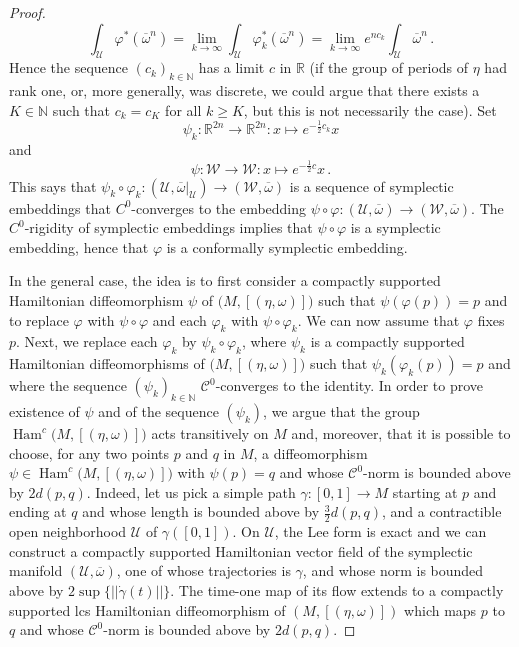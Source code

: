 \documentclass{amsart}
\newcommand{\N}{\mathbb{N}}
\newcommand{\R}{\mathbb{R}}
\DeclareMathOperator{\Ham}{Ham}
\theoremstyle{remark}
\begin{document}
\begin{proof}
$$
\int_{\mathcal{U}} \varphi^*(\overline{\omega}^n)
= \lim_{k\to \infty} \int_{\mathcal{U}} \varphi_k^*(\overline{\omega}^n)
= \lim_{k\to \infty}  e^{nc_k} \int_{\mathcal{U}} \overline{\omega}^n \,.
$$
Hence the sequence $(c_k)_{k \in \N}$ has a limit $c$ in $\R$
(if the group of periods of $\eta$ had rank one, or, more generally, was discrete,
we could argue that there exists a $K \in \N$ such that $c_k = c_K$ for all $k \geq K$,
but this is not necessarily the case).
Set 
$$
\psi_k : \R^{2n} \to \R^{2n} : x \mapsto e^{-\frac12 c_k} x
$$
and 
$$
\psi : \mathcal{W} \to \mathcal{W} : x \mapsto e^{-\frac12 c} x \,.
$$ 
This says that
$\psi_k \circ \varphi_k : (\mathcal{U}, \overline{\omega}|_{\mathcal{U}})
\to (\mathcal{W}, \overline{\omega})$
is a sequence of symplectic embeddings
that $C^0$-converges to the embedding
$\psi \circ \varphi : (\mathcal{U}, \overline{\omega})
\to (\mathcal{W}, \overline{\omega})$.
The $C^0$-rigidity of symplectic embeddings implies that
$\psi \circ \varphi$ is a symplectic embedding,
hence that $\varphi$ is a conformally symplectic embedding.

In the general case,
the idea is to first consider a compactly supported Hamiltonian diffeomorphism
$\psi$ of $\big(M, [(\eta, \omega)]\big)$
such that $\psi(\varphi(p)) = p$
and to replace $\varphi$ with $\psi \circ \varphi$
and each $\varphi_k$ with $\psi \circ \varphi_k$.
We can now assume that $\varphi$ fixes $p$.
Next, we replace each $\varphi_k$ by $\psi_k \circ \varphi_k$,
where $\psi_k$ is a compactly supported Hamiltonian diffeomorphisms
of $\big(M, [(\eta, \omega)]\big)$
such that $\psi_k (\varphi_k(p)) = p$
and where the sequence $(\psi_k)_{k \in \N}$
$\mathcal C^0$-converges to the identity.
In order to prove existence of $\psi$
and of the sequence $(\psi_k)$,
we argue that the group $\Ham^c \big(M, [(\eta, \omega)]\big)$
acts transitively on $M$ and, moreover,
that it is possible to choose,
for any two points $p$ and $q$ in $M$,
a diffeomorphism $\psi \in \Ham^c \big(M, [(\eta, \omega)]\big)$
with $\psi(p) = q$ and whose $\mathcal C^0$-norm is bounded above by $2d(p,q)$. 
Indeed, let us pick a simple path $\gamma : [0,1] \to M$
starting at $p$ and ending at $q$
and whose length is bounded above by $\frac32 d(p,q)$,
and a contractible open neighborhood $\mathcal{U}$ of $\gamma([0,1])$.
On $\mathcal{U}$, the Lee form is exact
and we can construct a compactly supported Hamiltonian vector field
of the symplectic manifold $(\mathcal{U}, \overline{\omega})$,
one of whose trajectories is $\gamma$,
and whose norm is bounded above by $2 \sup\{||\dot{\gamma}(t)||\}$.
The time-one map of its flow extends to a compactly supported lcs Hamiltonian diffeomorphism
of $(M, [(\eta, \omega)])$ which maps $p$ to $q$
and whose $\mathcal C^0$-norm is bounded above by $2d(p,q)$. 
\end{proof}
\end{document}
